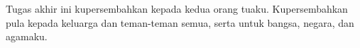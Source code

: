 \vspace{7cm}

\begin{center}
	Tugas akhir ini kupersembahkan kepada kedua orang tuaku. Kupersembahkan pula kepada keluarga dan teman-teman semua, serta untuk bangsa, negara, dan agamaku.

\end{center}

